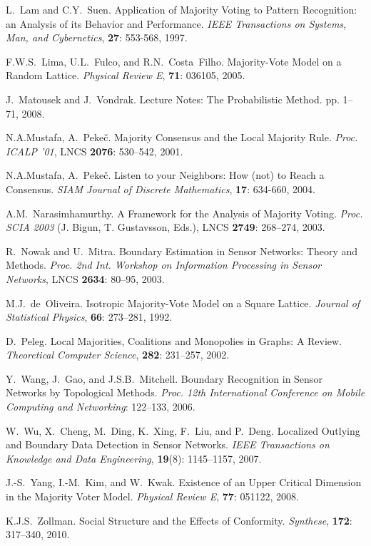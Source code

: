 \documentclass{article}
\begin{document}
\begin{thebibliography}{100}
 {L.~Lam and C.Y.~Suen}. {Application of Majority Voting
to Pattern Recognition: an Analysis of its Behavior and Performance}.
{\em IEEE Transactions on Systems, Man, and Cybernetics}, {\bf 27}: 553-568, 1997.

 {F.W.S.~Lima, U.L.~Fulco, and R.N.~Costa~Filho}.
{Majority-Vote Model on a Random Lattice}. {\em  Physical Review E},
{\bf 71}: 036105, 2005.

 {J.~Matousek and J.~Vondrak}.
{Lecture Notes: The Probabilistic Method}. pp. 1--71, 2008.

 {N.A.Mustafa, A.~Peke\v{c}}. {Majority Consensus and
the Local Majority Rule}.  {\em Proc. ICALP '01},
LNCS {\bf 2076}: 530--542, 2001.

 {N.A.Mustafa, A.~Peke\v{c}}.
{Listen to your Neighbors: How (not) to Reach a Consensus}.
{\em SIAM Journal of Discrete Mathematics}, {\bf 17}: 634-660, 2004.

 {A.M.~Narasimhamurthy}.
{A Framework for the Analysis of Majority Voting}.
{\em Proc. SCIA 2003} (J. Bigun, T. Gustavsson, Eds.),
LNCS {\bf 2749}: 268--274, 2003.

 {R.~Nowak and U.~Mitra}. {Boundary Estimation in
Sensor Networks: Theory and Methods}. {\em Proc. 2nd Int. Workshop on Information Processing in Sensor Networks}, LNCS {\bf 2634}: 80--95, 2003.

 {M.J.~de~Oliveira}. {Isotropic Majority-Vote Model on a
Square Lattice}. {\em Journal of Statistical Physics}, {\bf 66}: 273--281, 1992.

 {D.~Peleg}. {Local Majorities, Coalitions and Monopolies
in Graphs: A Review}. {\em Theoretical Computer Science}, {\bf 282}: 231--257, 2002.

 {Y.~Wang, J.~Gao, and J.S.B.~Mitchell}.
{Boundary Recognition in Sensor Networks by Topological Methods}.
{\em Proc. 12th International Conference on
Mobile Computing and Networking}: 122--133, 2006.

 {W.~Wu, X.~Cheng, M.~Ding, K.~Xing, F.~Liu, and P.~Deng}.
{Localized Outlying and Boundary Data Detection in Sensor Networks}.
{\em IEEE Transactions on Knowledge and Data Engineering}, {\bf 19}(8): 1145--1157, 2007.

 {J.-S.~Yang, I.-M.~Kim, and  W.~Kwak}.
{Existence of an Upper Critical Dimension in the Majority Voter Model}.
{\em Physical Review E}, {\bf 77}: 051122, 2008.

 {K.J.S.~Zollman}. {Social Structure and the Effects of
Conformity}. {\em Synthese}, {\bf 172}: 317--340, 2010.

\end{thebibliography}
\end{document}

